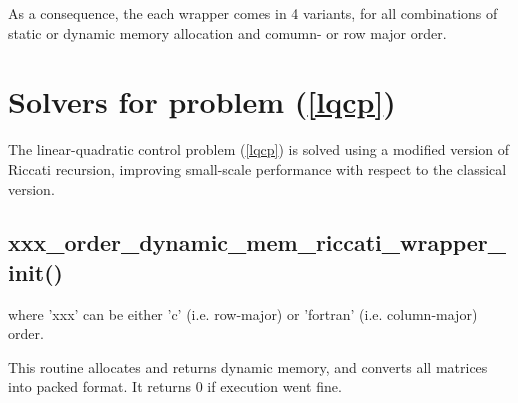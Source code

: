 \documentclass[a4paper]{report}
\begin{document}
As a consequence, the each wrapper comes in 4 variants, for all combinations of static or dynamic memory allocation and comumn- or row major order.

\section{Solvers for problem (\ref{lqcp})}

The linear-quadratic control problem (\ref{lqcp}) is solved using a modified version of Riccati recursion, improving small-scale performance with respect to the classical version.

\subsection{xxx\_order\_dynamic\_mem\_riccati\_wrapper\_init() } 
where 'xxx' can be either 'c' (i.e. row-major) or 'fortran' (i.e. column-major) order.

This routine allocates and returns dynamic memory, and converts all matrices into packed format.
It returns 0 if execution went fine.
\end{document}
